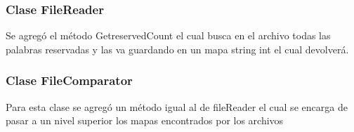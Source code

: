 \subsubsection{Clase FileReader}
Se agregó el método GetreservedCount el cual busca en el archivo todas las palabras reservadas y las va guardando en un mapa string int el cual devolverá.

\subsubsection{Clase FileComparator}
Para esta clase se agregó un método igual al de fileReader el cual se encarga de pasar a un nivel superior los mapas encontrados por los archivos
